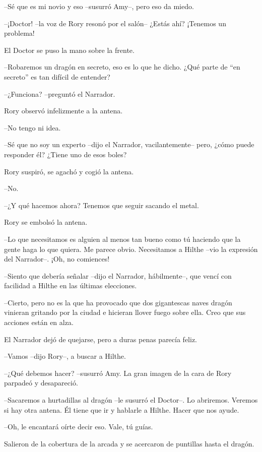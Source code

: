 {--Sé que es mi novio y eso --susurró Amy--, pero eso da miedo.}

{--¡Doctor! --la voz de Rory resonó por el salón-- ¿Estás ahí?
¡Tenemos un problema!}

{El Doctor se puso la mano sobre la frente.}

{--Robaremos un dragón en secreto, eso es lo que he dicho. ¿Qué parte
de ``en secreto'' es tan difícil de entender?}

\mbox{}

{--¿Funciona? --preguntó el Narrador.}

{Rory observó infelizmente a la antena.}

{--No tengo ni idea.}

{--Sé que no soy un experto --dijo el Narrador, vacilantemente-- pero,
¿cómo puede responder él? ¿Tiene uno de esos boles?}

{Rory suspiró, se agachó y cogió la antena.}

{--No.}

{--¿Y qué hacemos ahora? Tenemos que seguir sacando el metal.}

{Rory se embolsó la antena.}

{--Lo que necesitamos es alguien al menos tan bueno como tú haciendo
	que la gente haga lo que quiera. Me parece obvio. Necesitamos a Hilthe
--vio la expresión del Narrador--. ¡Oh, no comiences!}

{--Siento que debería señalar --dijo el Narrador, hábilmente--, que
vencí con facilidad a Hilthe en las últimas elecciones.}

{--Cierto, pero no es la que ha provocado que dos gigantescas naves
	dragón vinieran gritando por la ciudad e hicieran llover fuego sobre
ella. Creo que sus acciones están en alza.}

{El Narrador dejó de quejarse, pero a duras penas parecía feliz.}

{--Vamos --dijo Rory--, a buscar a Hilthe.}

\mbox{}

{--¿Qué debemos hacer? --susurró Amy. La gran imagen de la cara de
Rory parpadeó y desapareció.}

{--Sacaremos a hurtadillas al dragón --le susurró el Doctor--. Lo
	abriremos. Veremos si hay otra antena. Él tiene que ir y hablarle a
Hilthe. Hacer que nos ayude.}

{--Oh, le encantará oírte decir eso. Vale, tú guías.}

{Salieron de la cobertura de la arcada y se acercaron de puntillas hasta
el dragón.}

